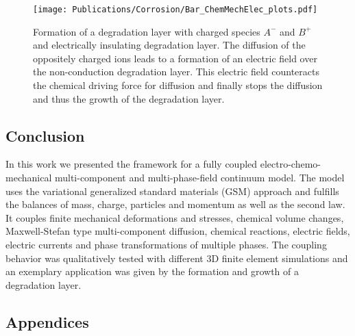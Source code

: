 \begin{figure}[h!]
  \centering
  \texttt{[image: Publications/Corrosion/Bar\_ChemMechElec\_plots.pdf]}
  \caption{Formation of a degradation layer with charged species $A^-$ and $B^+$ and electrically insulating degradation layer. The diffusion of the oppositely charged ions leads to a formation of an electric field over the non-conduction degradation layer. This electric field counteracts the chemical driving force for diffusion and finally stops the diffusion and thus the growth of the degradation layer.}
  \label{fig:BarChemMechElec}
\end{figure}

\subsection{Conclusion}
In this work we presented the framework for a fully coupled electro-chemo-mechanical multi-component and multi-phase-field continuum model. The model uses the variational generalized standard materials (GSM) approach and fulfills the balances of mass, charge, particles and momentum as well as the second law. It couples finite mechanical deformations and stresses, chemical volume changes, Maxwell-Stefan type multi-component diffusion, chemical reactions, electric fields, electric currents and phase transformations of multiple phases. The coupling behavior was qualitatively tested with different 3D finite element simulations and an exemplary application was given by the formation and growth of a degradation layer.


\subsection{Appendices}
